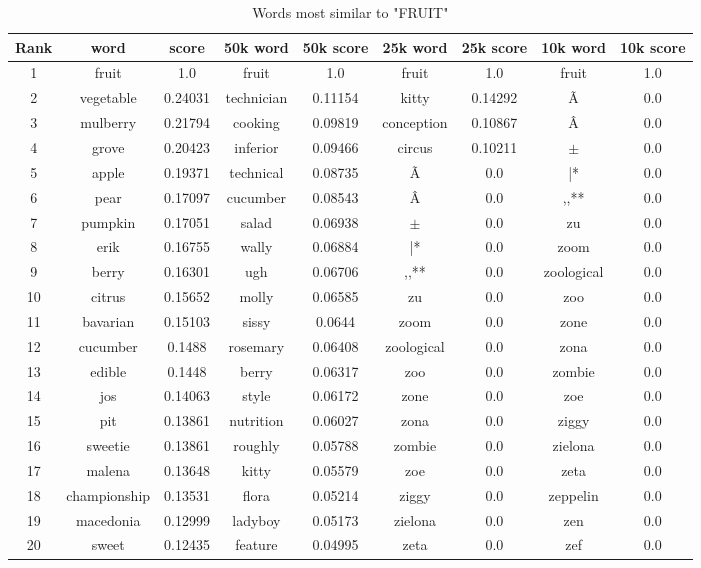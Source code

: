 \documentclass[10pt, a4paper, oneside]{article} %
\begin{document}
\begin{table}[!h]
\centering
\begin{tabular}{ | c | c | c | | c | c || c | c || c | c |}
\hline
Rank & word & score  & 50k word & 50k score & 25k word & 25k score & 10k word & 10k score\\ \hline
1 & fruit & 1.0 &fruit & 1.0 &fruit & 1.0  &fruit & 1.0\\
2 & vegetable & 0.24031 &technician & 0.11154 &kitty & 0.14292 &Ã & 0.0 \\
3 & mulberry & 0.21794 &cooking & 0.09819 &conception & 0.10867 &Â & 0.0 \\
4 & grove & 0.20423 &inferior & 0.09466 &circus & 0.10211 &$\pm$ & 0.0 \\
5 & apple & 0.19371 &technical & 0.08735 &Ã & 0.0 &|* & 0.0 \\
6 & pear & 0.17097 &cucumber & 0.08543 &Â & 0.0 &,,** & 0.0 \\
7 & pumpkin & 0.17051 &salad & 0.06938 &$\pm$ & 0.0 &zu & 0.0 \\
8 & erik & 0.16755 &wally & 0.06884 &|* & 0.0 &zoom & 0.0 \\
9 & berry & 0.16301 &ugh & 0.06706 &,,** & 0.0 &zoological & 0.0 \\
10 & citrus & 0.15652 &molly & 0.06585 &zu & 0.0 &zoo & 0.0 \\
11 & bavarian & 0.15103 &sissy & 0.0644 &zoom & 0.0 &zone & 0.0 \\
12 & cucumber & 0.1488 &rosemary & 0.06408 &zoological & 0.0 &zona & 0.0 \\
13 & edible & 0.1448 &berry & 0.06317 &zoo & 0.0 &zombie & 0.0 \\
14 & jos & 0.14063 &style & 0.06172 &zone & 0.0 &zoe & 0.0 \\
15 & pit & 0.13861 &nutrition & 0.06027 &zona & 0.0 &ziggy & 0.0 \\
16 & sweetie & 0.13861 &roughly & 0.05788 &zombie & 0.0 &zielona & 0.0 \\
17 & malena & 0.13648 &kitty & 0.05579 &zoe & 0.0 &zeta & 0.0 \\
18 & championship & 0.13531 &flora & 0.05214 &ziggy & 0.0 &zeppelin & 0.0 \\
19 & macedonia & 0.12999 &ladyboy & 0.05173 &zielona & 0.0 &zen & 0.0 \\
20 & sweet & 0.12435 &feature & 0.04995 &zeta & 0.0 &zef & 0.0 \\
 \hline
\end{tabular}
\caption{Words most similar to "FRUIT"}
\label{fruit}
\end{table}
\end{document}
